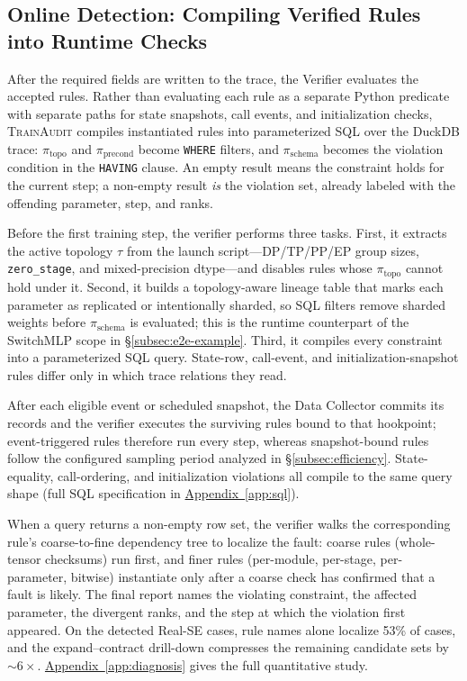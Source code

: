 \documentclass[sigconf,nonacm]{acmart}
\newcommand{\suppappendix}[1]{%
  \href{https://github.com/vivia-an/trainaudit-vldb-artifact/blob/vldb-2027-artifact-v1.0.1/paper/appendix_supplement.pdf}%
  {Appendix~\ref*{#1}}}
\begin{document}
\subsection{Online Detection: Compiling Verified Rules into Runtime Checks}
\label{subsec:error-analysis}

After the required fields are written to the trace, the Verifier evaluates the accepted rules. Rather than evaluating each rule as a separate Python predicate with separate paths for state snapshots, call events, and initialization checks, \textsc{TrainAudit} compiles instantiated rules into parameterized SQL over the DuckDB trace: $\pi_{\text{topo}}$ and $\pi_{\text{precond}}$ become \texttt{WHERE} filters, and $\pi_{\text{schema}}$ becomes the violation condition in the \texttt{HAVING} clause. An empty result means the constraint holds for the current step; a non-empty result \emph{is} the violation set, already labeled with the offending parameter, step, and ranks.

Before the first training step, the verifier performs three tasks. First, it extracts the active topology $\tau$ from the launch script---DP/TP/PP/EP group sizes, \texttt{zero\_stage}, and mixed-precision dtype---and disables rules whose $\pi_{\text{topo}}$ cannot hold under it. Second, it builds a topology-aware lineage table that marks each parameter as replicated or intentionally sharded, so SQL filters remove sharded weights before $\pi_{\text{schema}}$ is evaluated; this is the runtime counterpart of the SwitchMLP scope in \S\ref{subsec:e2e-example}. Third, it compiles every constraint into a parameterized SQL query. State-row, call-event, and initialization-snapshot rules differ only in which trace relations they read.

After each eligible event or scheduled snapshot, the Data Collector commits
its records and the verifier executes the surviving rules bound to that
hookpoint; event-triggered rules therefore run every step, whereas
snapshot-bound rules follow the configured sampling period analyzed in
\S\ref{subsec:efficiency}. State-equality, call-ordering, and initialization violations all compile to
the same query shape (full SQL specification in \suppappendix{app:sql}).

When a query returns a non-empty row set, the verifier walks the corresponding rule's coarse-to-fine dependency tree to localize the fault: coarse rules (whole-tensor checksums) run first, and finer rules (per-module, per-stage, per-parameter, bitwise) instantiate only after a coarse check has confirmed that a fault is likely. The final report names the violating constraint, the affected parameter, the divergent ranks, and the step at which the violation first appeared. On the detected Real-SE cases, rule names alone localize 53\% of cases, and the expand--contract drill-down compresses the remaining candidate sets by ${\sim}6\times$. \suppappendix{app:diagnosis} gives the full quantitative study.
\end{document}
